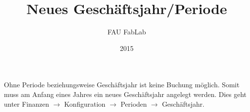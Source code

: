 \documentclass{\basedir/fablab-document}
\date{2015}
\author{FAU FabLab}
\title{Neues Geschäftsjahr/Periode}
\begin{document}

Ohne Periode beziehungsweise Geschäftsjahr ist keine Buchung möglich.
Somit muss am Anfang eines Jahres ein neues Geschäftsjahr angelegt werden.
Dies geht unter Finanzen $\rightarrow$ Konfiguration $\rightarrow$ Perioden $\rightarrow$ Geschäftsjahr.
\end{document}
